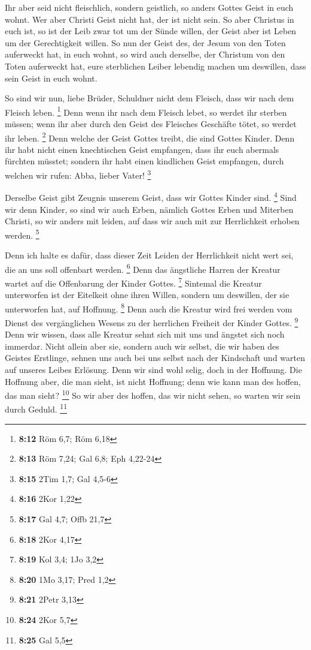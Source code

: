  Ihr aber seid nicht fleischlich, sondern geistlich, so
anders Gottes Geist in euch wohnt. Wer aber Christi Geist nicht hat, der
ist nicht sein.  So aber Christus in euch ist, so ist der
Leib zwar tot um der Sünde willen, der Geist aber ist Leben um der
Gerechtigkeit willen.  So nun der Geist des, der Jesum von
den Toten auferweckt hat, in euch wohnt, so wird auch derselbe, der
Christum von den Toten auferweckt hat, eure sterblichen Leiber lebendig
machen um deswillen, dass sein Geist in euch wohnt.

 So sind wir nun, liebe Brüder, Schuldner nicht dem
Fleisch, dass wir nach dem Fleisch leben. \footnote{\textbf{8:12} Röm
  6,7; Röm 6,18}  Denn wenn ihr nach dem Fleisch lebet, so
werdet ihr sterben müssen; wenn ihr aber durch den Geist des Fleisches
Geschäfte tötet, so werdet ihr leben. \footnote{\textbf{8:13} Röm 7,24;
  Gal 6,8; Eph 4,22-24}  Denn welche der Geist Gottes
treibt, die sind Gottes Kinder.  Denn ihr habt nicht einen
knechtischen Geist empfangen, dass ihr euch abermals fürchten müsstet;
sondern ihr habt einen kindlichen Geist empfangen, durch welchen wir
rufen: Abba, lieber Vater! \footnote{\textbf{8:15} 2Tim 1,7; Gal 4,5-6}

 Derselbe Geist gibt Zeugnis unserem Geist, dass wir Gottes
Kinder sind. \footnote{\textbf{8:16} 2Kor 1,22}  Sind wir
denn Kinder, so sind wir auch Erben, nämlich Gottes Erben und Miterben
Christi, so wir anders mit leiden, auf dass wir auch mit zur
Herrlichkeit erhoben werden. \footnote{\textbf{8:17} Gal 4,7; Offb 21,7}

 Denn ich halte es dafür, dass dieser Zeit Leiden der
Herrlichkeit nicht wert sei, die an uns soll offenbart werden.
\footnote{\textbf{8:18} 2Kor 4,17}  Denn das ängstliche
Harren der Kreatur wartet auf die Offenbarung der Kinder Gottes.
\footnote{\textbf{8:19} Kol 3,4; 1Jo 3,2}  Sintemal die
Kreatur unterworfen ist der Eitelkeit ohne ihren Willen, sondern um
deswillen, der sie unterworfen hat, auf Hoffnung. \footnote{\textbf{8:20}
  1Mo 3,17; Pred 1,2}  Denn auch die Kreatur wird frei
werden vom Dienst des vergänglichen Wesens zu der herrlichen Freiheit
der Kinder Gottes. \footnote{\textbf{8:21} 2Petr 3,13} 
Denn wir wissen, dass alle Kreatur sehnt sich mit uns und ängstet sich
noch immerdar.  Nicht allein aber sie, sondern auch wir
selbst, die wir haben des Geistes Erstlinge, sehnen uns auch bei uns
selbst nach der Kindschaft und warten auf unseres Leibes Erlösung.
 Denn wir sind wohl selig, doch in der Hoffnung. Die
Hoffnung aber, die man sieht, ist nicht Hoffnung; denn wie kann man des
hoffen, das man sieht? \footnote{\textbf{8:24} 2Kor 5,7} 
So wir aber des hoffen, das wir nicht sehen, so warten wir sein durch
Geduld. \footnote{\textbf{8:25} Gal 5,5}

